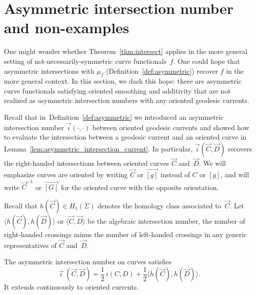 \section{Asymmetric intersection number and non-examples}
\label{sec:asymmetric}
One might wonder whether Theorem~\ref{thm:intersect} applies in the more general setting of
not-necessarily-symmetric curve functionals~$f$. One could hope that
asymmetric intersections with $\mu_f$ (Definition~\ref{def:asymmetric}) recover $f$ in the more
general context. In this section, we dash this hope: there are
asymmetric curve functionals satisfying oriented smoothing and additivity that
are not realized as asymmetric intersection numbers with any oriented
geodesic currents.

  Recall that in~Definition~\ref{def:asymmetric} we introduced an asymmetric
intersection number $\vec i (\cdot, \cdot)$ between oriented geodesic
currents and showed how to evaluate the intersection between a
geodesic current and an oriented curve in
Lemma~\ref{lem:asymmetric_intersection_current}. In particular, $\vec
i(\vec C, \vec D)$ recovers the right-handed intersections between
oriented curves $\vec C$ and~$\vec D$.
We will emphasize curves are oriented by writing
$\vec C$ or $\vec{[g]}$ instead of $C$ or $[g]$, and will write $\vec
C^{-1}$ or $\vec{[G]}$ for the oriented
curve with the opposite orientation.


\begin{definition}
Recall that $h(\vec C)\in H_1(\Sigma)$ denotes the homology class
  associated to~$\vec C$. Let
  $\langle h(\vec C), h(\vec D)\rangle$ or
  $\langle \vec C, \vec D\rangle$ be the algebraic intersection
  number, the number of right-handed crossings minus the number of
  left-handed crossings in any generic representatives of $\vec C$
  and~$\vec D$.
\end{definition}

\begin{lemma}\label{lem:asym-intersect}
  The asymmetric intersection number on curves satisfies
  \begin{equation}\label{eq:asym-intersect}
    \vec{\imath}(\vec C, \vec D) = {\textstyle\frac12}\,i(C, D) +
    {\textstyle\frac12}\langle h(\vec C), h(\vec D)\rangle.
  \end{equation}
  It extends continuously to oriented currents.
\end{lemma}

